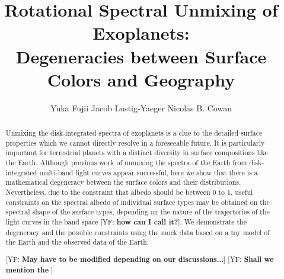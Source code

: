 \documentclass[iop,numberedappendix,apj]{emulateapj}
\def\memoYF#1{\color{red}[YF: {\bf #1}]\color{black}}
\begin{document}
\title{Rotational Spectral Unmixing of Exoplanets:\\Degeneracies between Surface Colors and Geography}


\author{
%
Yuka Fujii 
%
Jacob Lustig-Yaeger 
%
Nicolas B. Cowan 
%
}

      
  







\vspace{0.5\baselineskip}


\begin{abstract}

Unmixing the disk-integrated spectra of exoplanets is a clue to the detailed surface properties which we cannot directly resolve in a foreseeable future. 
It is particularly important for terrestrial planets with a distinct diversity in surface compositions like the Earth. 
Although previous work of unmixing the spectra of the Earth from disk-integrated multi-band light curves appear successful, here we show that there is a mathematical degeneracy between the surface colors and their distributions. 
Nevertheless, due to the constraint that albedo should be between 0 to 1, useful constraints on the spectral albedo of individual surface types may be obtained on the spectral shape of the surface types, depending on the nature of the trajectories of the light curves in the band space \memoYF{how can I call it?}. 
We demonstrate the degeneracy and the possible constraints using the mock data based on a toy model of the Earth and the observed data of the Earth. 

\memoYF{May have to be modified depending on our discussions...}
\memoYF{Shall we mention the }

\end{abstract}
\end{document}
